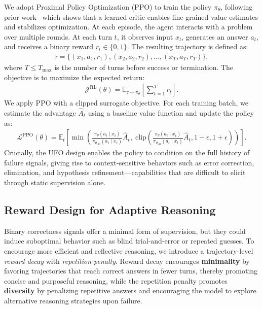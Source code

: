 We adopt Proximal Policy Optimization (PPO) to train the policy $\pi_\theta$, following prior work~\citep{hu2025openreasonerzeroopensourceapproach, ragen} which shows that a learned critic enables fine-grained value estimates and stabilizes optimization.
At each episode, the agent interacts with a problem over multiple rounds. At each turn $t$, it observes input $x_t$, generates an answer $a_t$, and receives a binary reward $r_t \in \{0, 1\}$. The resulting trajectory is defined as:
\begin{align}
\tau = \{(x_1, a_1, r_1), (x_2, a_2, r_2), \dots, (x_T, a_T, r_T)\},
\end{align}
where $T \leq T_{\text{max}}$ is the number of turns before success or termination. The objective is to maximize the expected return:
\begin{align}
\mathcal{J}^{\text{RL}}(\theta) = \mathbb{E}_{\tau \sim \pi_\theta} \left[ \sum_{t=1}^{T} r_t \right].
\end{align}
We apply PPO with a clipped surrogate objective. For each training batch, we estimate the advantage $\hat{A}_t$ using a baseline value function and update the policy as:
\begin{align}
\mathcal{L}^{\text{PPO}}(\theta) = \mathbb{E}_t \left[ \min \left( \frac{\pi_\theta(a_t \mid x_t)}{\pi_{\theta_\text{old}}(a_t \mid x_t)} \hat{A}_t,\; \text{clip}(\frac{\pi_\theta(a_t \mid x_t)}{\pi_{\theta_\text{old}}(a_t \mid x_t)} \hat{A}_t, 1 - \epsilon, 1 + \epsilon) \right) \right].
\end{align}
Crucially, the UFO design enables the policy to condition on the full history of failure signals, giving rise to context-sensitive behaviors such as error correction, elimination, and hypothesis refinement—capabilities that are difficult to elicit through static supervision alone.

\subsection{Reward Design for Adaptive Reasoning}
\label{sec:reward_design}
Binary correctness signals offer a minimal form of supervision, but they could induce suboptimal behavior such as blind trial-and-error or repeated guesses. To encourage more efficient and reflective reasoning, we introduce a trajectory-level \textit{reward decay} with \textit{repetition penalty}. Reward decay encourages \textbf{minimality} by favoring trajectories that reach correct answers in fewer turns, thereby promoting concise and purposeful reasoning, while the repetition penalty promotes \textbf{diversity} by penalizing repetitive answers and encouraging the model to explore alternative reasoning strategies upon failure.

